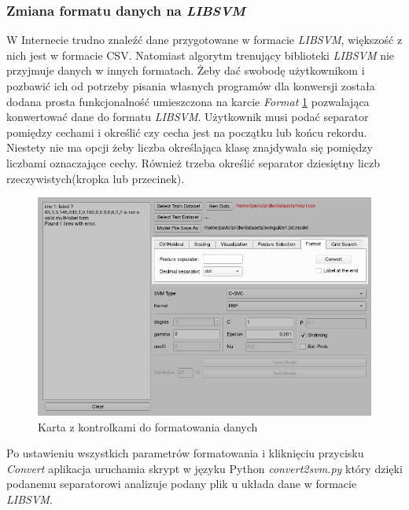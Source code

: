 \documentclass[paper=a4, fontsize=11pt]{scrartcl} %
\numberwithin{equation}{section} %
\numberwithin{figure}{section} %
\begin{document}
\subsubsection{Zmiana formatu danych na \textit{LIBSVM}}
    \par W Internecie trudno znaleźć dane przygotowane w formacie \textit{LIBSVM}, większość z
    nich jest w formacie CSV. Natomiast algorytm trenujący biblioteki \textit{LIBSVM} nie
    przyjmuje danych w innych formatach. Żeby dać swobodę użytkownikom i pozbawić ich od
    potrzeby pisania własnych programów dla konwersji została dodana prosta funkcjonalność
    umieszczona na karcie \textit{Format} \ref{fig:format} pozwalająca konwertować dane do
    formatu \textit{LIBSVM}. Użytkownik musi podać separator pomiędzy cechami i określić czy
    cecha jest na początku lub końcu rekordu. Niestety nie ma opcji żeby liczba określająca
    klasę znajdywała się pomiędzy liczbami oznaczające cechy. Również trzeba określić separator
    dziesiętny liczb rzeczywistych(kropka lub przecinek).

    \begin{figure}[H]
        \begin{center}
            \includegraphics[scale=0.7]{./img/svm_app_format.png}
            \caption{Karta z kontrolkami do formatowania danych}
            \label{fig:format}
        \end{center}
    \end{figure}

    \par Po ustawieniu wszystkich parametrów formatowania i kliknięciu przycisku
    \textit{Convert} aplikacja uruchamia skrypt w języku Python \textit{convert2svm.py} który
    dzięki podanemu separatorowi analizuje podany plik u układa dane w formacie
    \textit{LIBSVM}.
\end{document}
